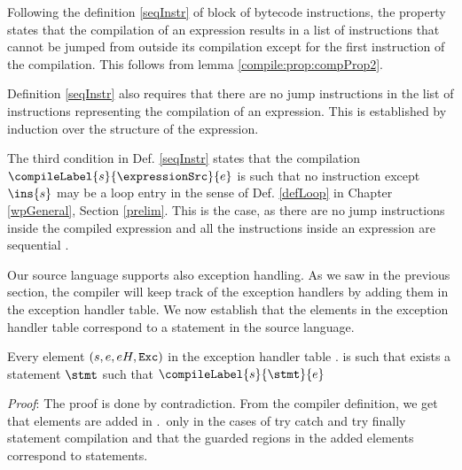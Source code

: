 Following the definition \ref{seqInstr} of block of bytecode instructions, 
the property states that the compilation of an expression results in a list of instructions that cannot be jumped from outside its compilation 
except for the first instruction of the compilation. This follows from lemma \ref{compile:prop:compProp2}. 

Definition \ref{seqInstr} also requires that there are no jump instructions  in the list of instructions representing the  compilation of an expression.
This is established by induction over the structure of the expression.

The third condition in Def. \ref{seqInstr} states that  the compilation $\compileLabel{s}{\expressionSrc}{e}$ is such that 
  no instruction except $\ins{s}$ may be  a loop entry  in the sense of Def.  \ref{defLoop} in Chapter
\ref{wpGeneral}, Section \ref{prelim}. This is the case, as there are no jump instructions inside the compiled expression  and all the instructions inside an
expression are sequential .

Our source language supports also exception handling. As we saw in the previous section, the compiler will keep track of the exception 
handlers by adding them in the exception handler table. We now establish that the elements in the exception handler table correspond to a statement
in the source language.

\begin{compProp7}\label{compile:prop:compProp7}
Every element  $ (s,e, eH, \mbox{\rm\texttt{Exc}} )$  in the exception handler table \methodd.\excHandlerTable 
  is such that exists a statement $\stmt$ such that $\compileLabel{s}{\stmt}{e}$


\end{compProp7} 
\textit{Proof}:
The proof is done by contradiction. From the compiler definition, we get that  elements are added in 
 \methodd.\excHandlerTable \ only in the cases of 
try catch and try finally statement compilation and that the guarded regions in the added elements correspond to statements.



